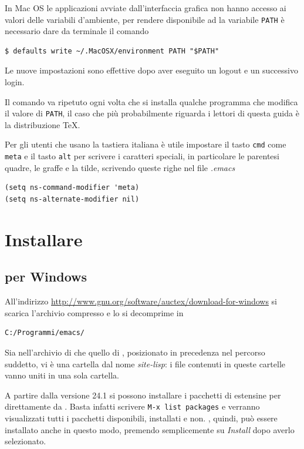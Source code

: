 \documentclass[11pt,a4paper]{article}
\begin{document}
In Mac OS le applicazioni avviate dall'interfaccia grafica non hanno
accesso ai valori delle variabili d'ambiente, per rendere disponibile
ad \emacs{} la variabile \texttt{PATH} è necessario dare da terminale
il comando
\begin{Verbatim}
$ defaults write ~/.MacOSX/environment PATH "$PATH"
\end{Verbatim}
Le nuove impostazioni sono effettive dopo aver eseguito un logout e un
successivo login.

Il comando va ripetuto ogni volta che si installa qualche programma
che modifica il valore di \texttt{PATH}, il caso che più probabilmente
riguarda i lettori di questa guida è la distribuzione \TeX{}.

Per gli utenti che usano la tastiera italiana è utile impostare il
tasto \texttt{cmd} come \texttt{meta} e il tasto \texttt{alt} per
scrivere i caratteri speciali, in particolare le parentesi quadre, le
graffe e la tilde, scrivendo queste righe nel file \emph{.emacs}
\begin{Verbatim}
(setq ns-command-modifier 'meta)
(setq ns-alternate-modifier nil)
\end{Verbatim}

\section{Installare \auctex}
\label{sec:installauc}

\subsection{\auctex{} per Windows}
\label{sec:auctexwin}

All'indirizzo \url{http://www.gnu.org/software/auctex/download-for-windows}
si scarica l'archivio compresso  e lo si
decomprime in
\begin{Verbatim}
C:/Programmi/emacs/
\end{Verbatim}

Sia nell'archivio di \auctex{} che quello di \emacs, posizionato in precedenza
nel percorso suddetto, vi è una cartella dal nome \emph{site-lisp}: i file
contenuti in queste cartelle vanno uniti in una sola cartella.

A partire dalla versione 24.1 si possono installare i pacchetti di estensine per
\emacs{} direttamente da \emacs{}. Basta infatti scrivere
\verb!M-x list packages! e verranno visualizzati tutti i pacchetti disponibili,
installati e non. \auctex, quindi, può essere installato anche in questo modo,
premendo semplicemente su \emph{Install} dopo averlo selezionato.
\end{document}
